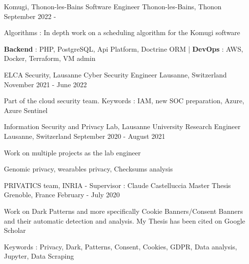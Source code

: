 


\begin{cventries}
	
	\cventry
	{Komugi, Thonon-les-Bains} %
	{Software Engineer} %
	{Thonon-les-Bains, Thonon} %
	{September 2022 - } %
	{ %
		\begin{cvitems}
			\item {Algorithms : In depth work on a scheduling algorithm for the Komugi software}
			\item {\textbf{Backend} : PHP, PostgreSQL, Api Platform, Doctrine ORM | \textbf{DevOps} : AWS, Docker, Terraform, VM admin}
		\end{cvitems}
	}
	
	\cventry
	{ELCA Security, Lausanne} %
	{Cyber Security Engineer} %
	{Lausanne, Switzerland} %
	{November 2021 - June 2022} %
	{ %
		\begin{cvitems}
			\item {Part of the cloud security team. Keywords : IAM, new SOC preparation, Azure, Azure Sentinel}
		\end{cvitems}
	}
	
	\cventry
	{Information Security and Privacy Lab, Lausanne University} %
	{Research Engineer} %
	{Lausanne, Switzerland} %
	{September 2020 - August 2021} %
	{ %
		\begin{cvitems}
			\item {Work on multiple projects as the lab engineer}
			\item {Genomic privacy, wearables privacy, Checksums analysis}
		\end{cvitems}
	}
	
	\cventry
	{PRIVATICS team, INRIA - Supervisor : Claude Castelluccia} %
	{Master Thesis} %
	{Grenoble, France} %
	{February - July 2020} %
	{ %
		\begin{cvitems}
			\item {Work on Dark Patterns and more specifically Cookie Banners/Consent Banners and their automatic detection and analysis. My Thesis has been cited on Google Scholar}
			\item {Keywords : Privacy, Dark, Patterns, Consent, Cookies, GDPR, Data analysis, Jupyter, Data Scraping}
		\end{cvitems}
	}
	

\end{cventries}
